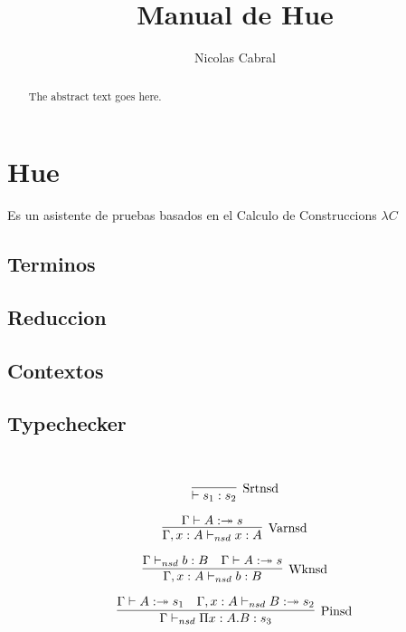 \documentclass{article}
\theoremstyle{definition}
\theoremstyle{remark}
\begin{document}
\title{Manual de Hue}
\author{Nicolas Cabral}

\maketitle

\begin{abstract}
The abstract text goes here.
\end{abstract}

\section{Hue}

  Es un asistente de pruebas basados en el Calculo de Construccions $\lambda C$






\subsection{Terminos}
\subsection{Reduccion}
\subsection{Contextos}
\subsection{Typechecker}
~\cite{Jutting93checkingalgorithms}
~\cite{Benthem:93}
~\cite{DBLP:conf/types/JuttingMP93}

\begin{equation}
    \label{simple_equation}
\infer[\mathrm{Srtnsd}]
{\vdash s_{1} : s_{2}}{}
\end{equation}

\begin{equation}
    \label{simple_equation}
\infer[\mathrm{Varnsd}]
{\Gamma, x:A \vdash_{nsd} x : A}{\Gamma \vdash A :\twoheadrightarrow s}
\end{equation}

\begin{equation}
    \label{simple_equation}
\infer[\mathrm{Wknsd}]
{\Gamma, x:A \vdash_{nsd} b : B}{\Gamma \vdash_{nsd} b : B & \Gamma \vdash A :\twoheadrightarrow s}
\end{equation}

\begin{equation}
    \label{simple_equation}
\infer[\mathrm{Pinsd}]
{\Gamma \vdash_{nsd} \Pi x:A.B :s_{3}}{\Gamma \vdash A :\twoheadrightarrow s_{1} & \Gamma, x:A \vdash_{nsd} B :\twoheadrightarrow s_{2}}
\end{equation}
\end{document}
